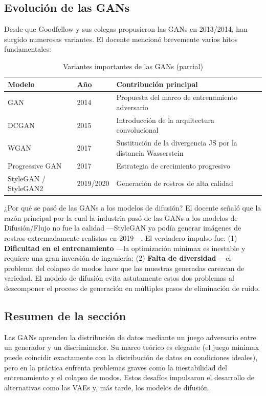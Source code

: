 \subsection{Evolución de las GANs}

Desde que Goodfellow y sus colegas propusieron las GANs en 2013/2014, han surgido numerosas variantes. El docente mencionó brevemente varios hitos fundamentales:

\begin{table}[H]
\centering
\begin{tabular}{lll}
\toprule
Modelo & Año & Contribución principal \\
\midrule
GAN & 2014 & Propuesta del marco de entrenamiento adversario \\
DCGAN & 2015 & Introducción de la arquitectura convolucional \\
WGAN & 2017 & Sustitución de la divergencia JS por la distancia Wasserstein \\
Progressive GAN & 2017 & Estrategia de crecimiento progresivo \\
StyleGAN / StyleGAN2 & 2019/2020 & Generación de rostros de alta calidad \\
\bottomrule
\end{tabular}
\caption{Variantes importantes de las GANs (parcial)}
\end{table}

\begin{knowledgebox}{¿Por qué se pasó de las GANs a los modelos de difusión?}
El docente señaló que la razón principal por la cual la industria pasó de las GANs a los modelos de Difusión/Flujo no fue la calidad —StyleGAN ya podía generar imágenes de rostros extremadamente realistas en 2019—. El verdadero impulso fue: (1) \textbf{Dificultad en el entrenamiento} —la optimización minimax es inestable y requiere una gran inversión de ingeniería; (2) \textbf{Falta de diversidad} —el problema del colapso de modos hace que las muestras generadas carezcan de variedad. El modelo de difusión evita astutamente estos dos problemas al descomponer el proceso de generación en múltiples pasos de eliminación de ruido.
\end{knowledgebox}

\subsection{Resumen de la sección}

Las GANs aprenden la distribución de datos mediante un juego adversario entre un generador y un discriminador. Su marco teórico es elegante (el juego minimax puede coincidir exactamente con la distribución de datos en condiciones ideales), pero en la práctica enfrenta problemas graves como la inestabilidad del entrenamiento y el colapso de modos. Estos desafíos impulsaron el desarrollo de alternativas como las VAEs y, más tarde, los modelos de difusión.

\newpage
